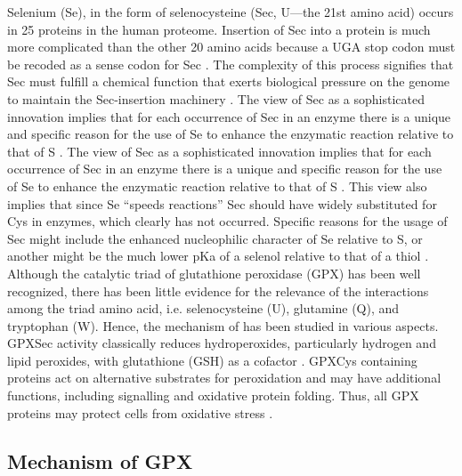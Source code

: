 \documentclass[journal=jacsat,manuscript=article]{achemso}
\begin{document}
Selenium (Se), in the form of selenocysteine (Sec, U—the 21st amino acid) occurs in 25 proteins in the human proteome. Insertion of Sec into a protein is much more complicated than the other 20 amino acids because a UGA stop codon must be recoded as a sense codon for Sec \cite{Hondal2011}. The complexity of this process signifies that Sec must fulfill a chemical function that exerts biological pressure on the genome to maintain the Sec-insertion machinery \cite{Hondal2011} \cite{Cardey2007}. The view of Sec as a sophisticated innovation implies that for each occurrence of Sec in an enzyme there is a unique and specific reason for the use of Se to enhance the enzymatic reaction relative to that of S \cite{Hondal2011}. The view of Sec as a sophisticated innovation implies that for each occurrence of Sec in an enzyme there is a unique and specific reason for the use of Se to enhance the enzymatic reaction relative to that of S \cite{Hondal2011}. This view also implies that since Se “speeds reactions” Sec should have widely substituted for Cys in enzymes, which clearly has not occurred. Specific reasons for the usage of Sec might include the enhanced nucleophilic character of Se relative to S, or another might be the much lower pKa of a selenol relative to that of a thiol \cite{Hondal2011}. Although the catalytic triad of glutathione peroxidase (GPX) has been well recognized, there has been little evidence for the relevance of the interactions among the triad amino acid, i.e. selenocysteine (U), glutamine (Q), and tryptophan (W). Hence, the mechanism of has been studied in various aspects. GPXSec activity classically reduces hydroperoxides, particularly hydrogen and lipid peroxides, with glutathione (GSH) as a cofactor \cite{Rees2024}. GPXCys  containing proteins act on alternative substrates for peroxidation and may have additional functions, including signalling and oxidative protein folding. Thus, all GPX proteins may protect cells from oxidative stress \cite{Rees2024}. 

\subsection{Mechanism of GPX}
\end{document}
